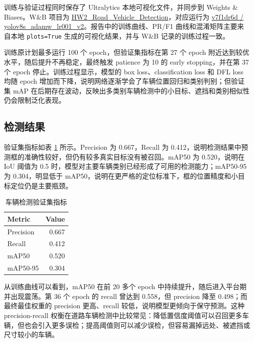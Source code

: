 \documentclass[UTF8,a4paper,11pt]{ctexart}
\newcommand{\code}[1]{\texttt{#1}}
\begin{document}
训练与验证过程同时保存了 Ultralytics 本地可视化文件，并同步到 Weights \& Biases。W\&B 项目为 \href{https://wandb.ai/crepuscule-fudan/HW2_Road_Vehicle_Detection}{HW2\_Road\_Vehicle\_Detection}，对应运行为 \href{https://wandb.ai/crepuscule-fudan/HW2_Road_Vehicle_Detection/runs/v7f1dr6d}{v7f1dr6d / yolov8s\_adamw\_lr001\_v2}。报告中的训练曲线、PR/F1 曲线和混淆矩阵主要来自本地 \code{plots=True} 生成的可视化结果，并与 W\&B 记录的训练过程一致。

训练原计划最多运行 100 个 epoch，但验证集指标在第 27 个 epoch 附近达到较优水平，随后提升不再稳定，最终触发 patience 为 10 的 early stopping，并在第 37 个 epoch 停止。训练过程显示，模型的 box loss、classification loss 和 DFL loss 均随 epoch 增加而下降，说明网络逐渐学会了车辆位置回归和类别判别；但验证集 mAP 在后期存在波动，反映出多类别车辆检测中的小目标、遮挡和类别相似性仍会限制泛化表现。

\subsection{检测结果}

验证集指标如表 \ref{tab:detection-metrics} 所示。Precision 为 0.667，Recall 为 0.412，说明检测结果中预测框的准确性较好，但仍有较多真实目标没有被召回。mAP50 为 0.520，说明在 IoU 阈值为 0.5 时，模型对主要车辆类别已经形成了可用的检测能力；mAP50-95 为 0.304，明显低于 mAP50，说明在更严格的定位标准下，框的位置精度和小目标定位仍是主要瓶颈。

\begin{table}[H]
    \centering
    \caption{车辆检测验证集指标}
    \label{tab:detection-metrics}
    \small
    \begin{tabular}{lr}
        \toprule
        Metric & Value \\
        \midrule
        Precision & 0.667 \\
        Recall & 0.412 \\
        mAP50 & 0.520 \\
        mAP50-95 & 0.304 \\
        \bottomrule
    \end{tabular}
\end{table}

从训练曲线可以看到，mAP50 在前 20 多个 epoch 中持续提升，随后进入平台期并出现震荡。第 36 个 epoch 的 recall 曾达到 0.558，但 precision 降至 0.498；而最终最佳权重的 precision 更高、recall 较低，说明模型更倾向于保守预测。这种 precision-recall 权衡在道路车辆检测中比较常见：降低置信度阈值可以召回更多车辆，但也会引入更多误检；提高阈值则可以减少误检，但容易漏掉远处、被遮挡或尺寸较小的车辆。
\end{document}
